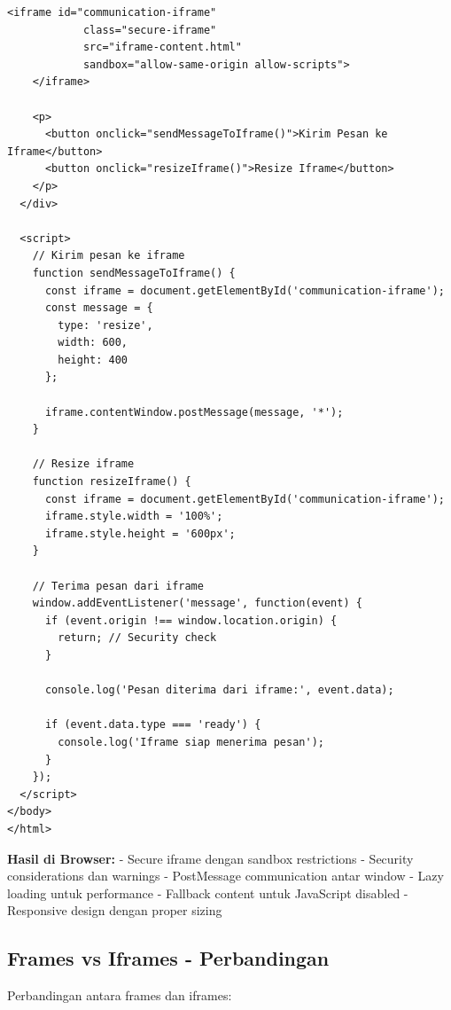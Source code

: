 \begin{lstlisting}[caption={Secure Iframe Implementation}, basicstyle=\ttfamily\small, frame=single]
    <iframe id="communication-iframe" 
            class="secure-iframe"
            src="iframe-content.html"
            sandbox="allow-same-origin allow-scripts">
    </iframe>
    
    <p>
      <button onclick="sendMessageToIframe()">Kirim Pesan ke Iframe</button>
      <button onclick="resizeIframe()">Resize Iframe</button>
    </p>
  </div>
  
  <script>
    // Kirim pesan ke iframe
    function sendMessageToIframe() {
      const iframe = document.getElementById('communication-iframe');
      const message = {
        type: 'resize',
        width: 600,
        height: 400
      };
      
      iframe.contentWindow.postMessage(message, '*');
    }
    
    // Resize iframe
    function resizeIframe() {
      const iframe = document.getElementById('communication-iframe');
      iframe.style.width = '100%';
      iframe.style.height = '600px';
    }
    
    // Terima pesan dari iframe
    window.addEventListener('message', function(event) {
      if (event.origin !== window.location.origin) {
        return; // Security check
      }
      
      console.log('Pesan diterima dari iframe:', event.data);
      
      if (event.data.type === 'ready') {
        console.log('Iframe siap menerima pesan');
      }
    });
  </script>
</body>
</html>
\end{lstlisting}

\textbf{Hasil di Browser:}
- Secure iframe dengan sandbox restrictions
- Security considerations dan warnings
- PostMessage communication antar window
- Lazy loading untuk performance
- Fallback content untuk JavaScript disabled
- Responsive design dengan proper sizing

\subsection{Frames vs Iframes - Perbandingan}

Perbandingan antara frames dan iframes:

